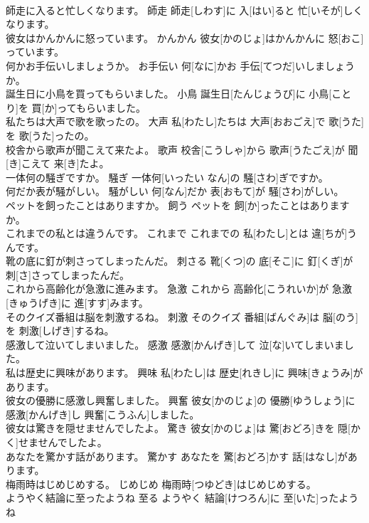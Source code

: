 \documentclass[8pt]{extreport}
\begin{document}
\begin{CJK}{UTF8}{min}
\\	師走に入ると忙しくなります。	師走	師走[しわす]に 入[はい]ると 忙[いそが]しくなります。	
\\	彼女はかんかんに怒っています。	かんかん	彼女[かのじょ]はかんかんに 怒[おこ]っています。	
\\	何かお手伝いしましょうか。	お手伝い	何[なに]かお 手伝[てつだ]いしましょうか。	
\\	誕生日に小鳥を買ってもらいました。	小鳥	誕生日[たんじょうび]に 小鳥[ことり]を 買[か]ってもらいました。	
\\	私たちは大声で歌を歌ったの。	大声	私[わたし]たちは 大声[おおごえ]で 歌[うた]を 歌[うた]ったの。	
\\	校舎から歌声が聞こえて来たよ。	歌声	校舎[こうしゃ]から 歌声[うたごえ]が 聞[き]こえて 来[き]たよ。	
\\	一体何の騒ぎですか。	騒ぎ	一体何[いったい なん]の 騒[さわ]ぎですか。	
\\	何だか表が騒がしい。	騒がしい	何[なん]だか 表[おもて]が 騒[さわ]がしい。	
\\	ペットを飼ったことはありますか。	飼う	ペットを 飼[か]ったことはありますか。	
\\	これまでの私とは違うんです。	これまで	これまでの 私[わたし]とは 違[ちが]うんです。	
\\	靴の底に釘が刺さってしまったんだ。	刺さる	靴[くつ]の 底[そこ]に 釘[くぎ]が 刺[さ]さってしまったんだ。	
\\	これから高齢化が急激に進みます。	急激	これから 高齢化[こうれいか]が 急激[きゅうげき]に 進[すす]みます。	
\\	そのクイズ番組は脳を刺激するね。	刺激	そのクイズ 番組[ばんぐみ]は 脳[のう]を 刺激[しげき]するね。	
\\	感激して泣いてしまいました。	感激	感激[かんげき]して 泣[な]いてしまいました。	
\\	私は歴史に興味があります。	興味	私[わたし]は 歴史[れきし]に 興味[きょうみ]があります。	
\\	彼女の優勝に感激し興奮しました。	興奮	彼女[かのじょ]の 優勝[ゆうしょう]に 感激[かんげき]し 興奮[こうふん]しました。	
\\	彼女は驚きを隠せませんでしたよ。	驚き	彼女[かのじょ]は 驚[おどろ]きを 隠[かく]せませんでしたよ。	
\\	あなたを驚かす話があります。	驚かす	あなたを 驚[おどろ]かす 話[はなし]があります。	
\\	梅雨時はじめじめする。	じめじめ	梅雨時[つゆどき]はじめじめする。	
\\	ようやく結論に至ったようね	至る	ようやく 結論[けつろん]に 至[いた]ったようね	

\end{CJK}
\end{document}
